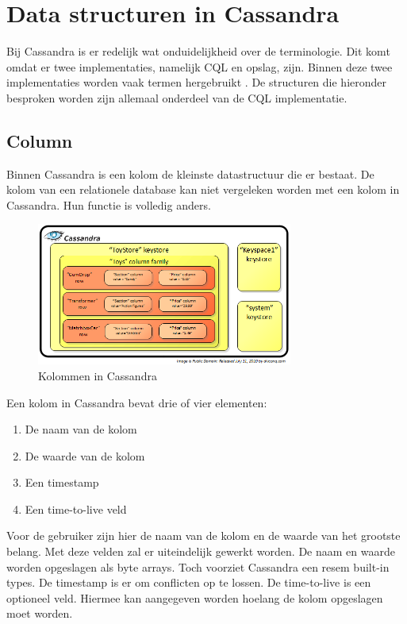 \chapter{Data structuren in Cassandra}
\label{ch:cassandra_data}

Bij Cassandra is er redelijk wat onduidelijkheid over de terminologie.
Dit komt omdat er twee implementaties, namelijk CQL en opslag, zijn.
Binnen deze twee implementaties worden vaak termen hergebruikt \citep{Ahmed2015Terminology}.
De structuren die hieronder besproken worden zijn allemaal onderdeel van de CQL implementatie.

\section{Column}
Binnen Cassandra is een kolom de kleinste datastructuur die er bestaat.
De kolom van een relationele database kan niet vergeleken worden met een kolom in Cassandra.
Hun functie is volledig anders.

\begin{figure}[H]
	\centering
	\includegraphics[width=0.75\textwidth]{img/4_data/column}
	\caption{Kolommen in Cassandra}
	\label{fig:column}
\end{figure}

Een kolom in Cassandra bevat drie of vier elementen:
\begin{enumerate}
	\item De naam van de kolom
	\item De waarde van de kolom
	\item Een timestamp
	\item Een time-to-live veld
\end{enumerate}

Voor de gebruiker zijn hier de naam van de kolom en de waarde van het grootste belang.
Met deze velden zal er uiteindelijk gewerkt worden.
De naam en waarde worden opgeslagen als byte arrays.
Toch voorziet Cassandra een resem built-in types.
De timestamp is er om conflicten op te lossen.
De time-to-live is een optioneel veld.
Hiermee kan aangegeven worden hoelang de kolom opgeslagen moet worden.


